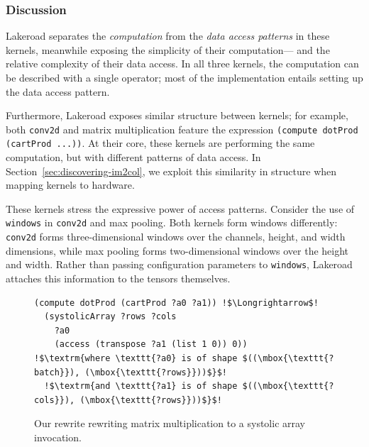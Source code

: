 \documentclass[prologue, dvipsnames, sigplan, screen, review, anonymous]{acmart}
\newcommand{\g}{Lakeroad\xspace}
\newcommand{\ctd}{\texttt{conv2d}\xspace}
\newcommand{\tcd}[1]{\texttt{#1}}
\begin{document}
  
\subsubsection{Discussion}\label{section:kernel-implementation-discussion}

\g separates
  the \textit{computation}
  from the \textit{data access patterns}
  in these kernels,
  meanwhile exposing
  the simplicity of their computation---%
  and the relative complexity
  of their data access.
In all three kernels,
  the computation can be described
  with a single operator;
  most of the implementation
  entails
  setting up the data access pattern.

Furthermore,
  \g exposes similar structure
  between kernels;
  for example,
  both \ctd
  and matrix multiplication
  feature the expression
  \tcd{(compute dotProd (cartProd ...))}.
At their core, these kernels
  are performing the same computation,
  but with different patterns
  of data access.
In Section~\ref{sec:discovering-im2col},
  we exploit this similarity in structure
  when mapping kernels to hardware.
  
These kernels stress the expressive power
  of access patterns.
Consider the use of 
  \tcd{windows}
  in \ctd
   and max pooling.
Both kernels
  form windows
  differently:
  \ctd forms three-dimensional
  windows
  over the channels, height, and width
  dimensions,
  while max pooling forms two-dimensional windows
  over the height and width.
Rather than passing configuration parameters to \tcd{windows},
  \g attaches this information to the tensors themselves.
  
  
\begin{figure}
\begin{lstlisting}[escapechar=!]
(compute dotProd (cartProd ?a0 ?a1)) !$\Longrightarrow$!
  (systolicArray ?rows ?cols
    ?a0 
    (access (transpose ?a1 (list 1 0)) 0))
!$\textrm{where \texttt{?a0} is of shape $((\mbox{\texttt{?batch}}), (\mbox{\texttt{?rows}}))$}$!
  !$\textrm{and \texttt{?a1} is of shape $((\mbox{\texttt{?cols}}), (\mbox{\texttt{?rows}}))$}$!
\end{lstlisting}
\justify
\caption{Our rewrite rewriting matrix multiplication to a systolic array invocation.}
    \label{fig:systolic-array-rewrite}
\end{figure}
  
\end{document}
